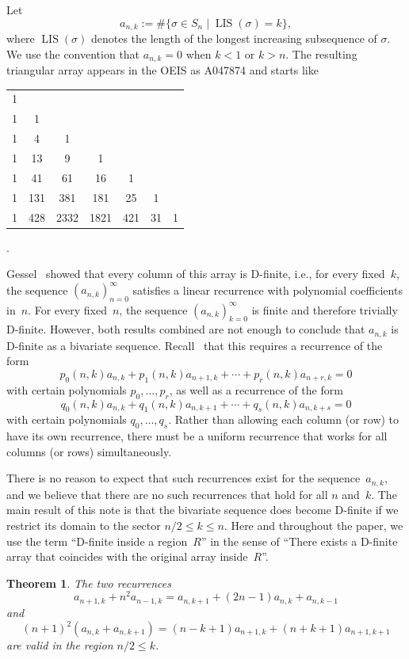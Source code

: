 \documentclass[a4paper,draft]{amsart}
\newtheorem{theorem}{Theorem}
\DeclareMathOperator{\LIS}{LIS}
\begin{document}
Let
\[
a_{n,k}:=\#\{\sigma\in S_n\mid \LIS(\sigma)=k\},
\]
where $\LIS(\sigma)$ denotes the length of the longest increasing subsequence of $\sigma$. We use the convention that $a_{n,k}=0$ when $k<1$ or $k>n$. The resulting triangular array appears in the OEIS as A047874 and starts like
\begin{center}
  \begin{tabular}{ccccccc}
    1 \\
    1 & 1 \\
    1 & 4 & 1 \\
    1 & 13 & 9 & 1 \\
    1 & 41 & 61 & 16 & 1 \\
    1 & 131 & 381 & 181 & 25 & 1 \\
    1 & 428 & 2332 & 1821 & 421 & 31 & 1
  \end{tabular}.
\end{center}
Gessel~\cite{MR1041448} showed that every column of this array is D-finite, i.e., for every fixed~$k$, the
sequence $(a_{n,k})_{n=0}^\infty$ satisfies a linear recurrence with polynomial coefficients in~$n$.
For every fixed~$n$, the sequence $(a_{n,k})_{k=0}^\infty$ is finite and therefore trivially D-finite.
However, both results combined are not enough to conclude that $a_{n,k}$ is D-finite as a bivariate
sequence. Recall~\cite{Kauers23} that this requires a recurrence of the form
\[
  p_0(n,k)a_{n,k} + p_1(n,k)a_{n+1,k} + \cdots + p_r(n,k)a_{n+r,k} = 0
\]
with certain polynomials $p_0,\dots,p_r$, as well as a recurrence of the form
\[
  q_0(n,k)a_{n,k} + q_1(n,k)a_{n,k+1} + \cdots + q_s(n,k)a_{n,k+s} = 0
\]
with certain polynomials $q_0,\dots,q_s$. Rather than allowing each column (or row) to have its own
recurrence, there must be a uniform recurrence that works for all columns (or rows) simultaneously.

There is no reason to expect that such recurrences exist for the
sequence~$a_{n,k}$, and we believe that there are no such recurrences that hold
for all $n$ and~$k$. The main result of this note is that the bivariate sequence
does become D-finite if we restrict its domain to the sector $n/2 \leq k \leq n$.
Here and throughout the paper, we use the term ``D-finite inside a region~$R$''
in the sense of ``There exists a D-finite array that coincides with the original
array inside~$R$''.
\begin{theorem}\label{thm}
The two recurrences
\begin{equation}\label{eq:rec}
a_{n+1,k}+n^2a_{n-1,k} = a_{n,k+1}+(2n-1)a_{n,k}+a_{n,k-1}
\end{equation}
and
\begin{equation}\label{eq:rec2}
(n+1)^2(a_{n,k}+a_{n,k+1}) = (n-k+1)a_{n+1,k}+(n+k+1)a_{n+1,k+1}
\end{equation}
are valid in the region $n/2\leq k$.
\end{theorem}
\end{document}
